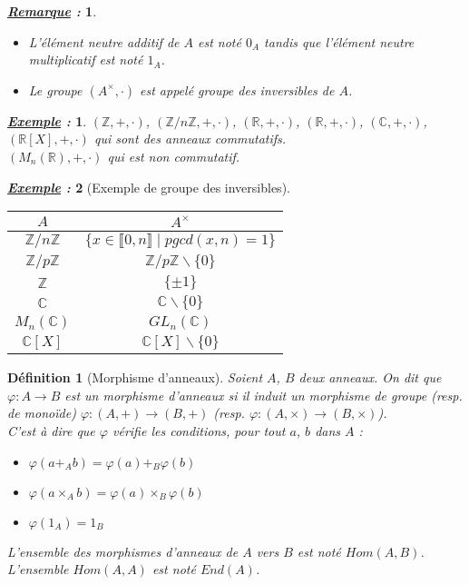 \documentclass{article}           %
\newcommand\Z{\mathbb{Z}}
\newcommand\R{\mathbb{R}}
\newcommand\C{\mathbb{C}}
\newcommand\inter[1]{\llbracket {#1} \rrbracket} 	%
\theoremstyle{break}
\theoremstyle{add}
\theoremstyle{break} %
\newtheorem{definition}{Définition}[section]
\theoremstyle{add}
\newtheorem*{exemple}{\textit{\underline{Exemple} :}}
\newtheorem*{remarque}{\textit{\underline{Remarque} : }}
\newcommand\NL{
\mbox{}
\vspace*{-\parsep}
\vspace*{-\baselineskip}}
\begin{document}
\begin{remarque}\NL
\begin{itemize}
\item L’élément neutre additif de $A$ est noté $0_A$ tandis que l'élément neutre multiplicatif est noté $1_A$.
\item Le groupe $(A^{\times}, \cdot)$ est appelé \textit{groupe des inversibles} de $A$.
\end{itemize}
\end{remarque}

\begin{exemple}
$(\Z, +, \cdot)$, $(\Z /n \Z, +, \cdot)$, $(\R, +, \cdot)$, $(\R, +, \cdot)$, $(\C, +, \cdot)$, $(\R[X], +, \cdot)$ qui sont des anneaux commutatifs.\\
$(M_n(\R), +, \cdot)$ qui est non commutatif.
\end{exemple}

\begin{exemple}[Exemple de groupe des inversibles]\NL
\begin{tabular}{|c|c|}
\hline
$A$ & $A^\times$ \\
\hline
\hline
$\Z /n \Z$ & $\{x \in \inter{0,n} \;|\; pgcd(x,n)=1 \} $\\
\hline
$\Z /p \Z$ & $\Z /p \Z \backslash \{0\}$ \\
\hline
$\Z$ & $\{ \pm 1 \}$ \\
\hline
$\C$ & $\C \backslash \{0\}$ \\
\hline
$M_n(\C)$ & $GL_n(\C)$ \\
\hline
$\C[X]$ & $\C[X] \backslash \{0\}$ \\
\hline
\end{tabular}
\end{exemple}

\begin{definition}[Morphisme d'anneaux]
Soient $A$, $B$ deux anneaux. On dit que $\varphi : A \rightarrow B$ est un morphisme d'anneaux si il induit un morphisme de groupe (resp. de monoïde) $\varphi : (A, +) \rightarrow (B,+)$ (resp. $\varphi : (A, \times) \rightarrow (B,\times)$). \\
C'est à dire que $\varphi$ vérifie les conditions, pour tout $a$, $b$ dans $A$ :
\begin{itemize}
\item $\varphi(a +_A b) = \varphi(a) +_B \varphi(b)$
\item $\varphi(a \times_A b) = \varphi(a) \times_B \varphi(b)$
\item $\varphi(1_A) = 1_B$
\end{itemize}
L'ensemble des morphismes d'anneaux de $A$ vers $B$ est noté $Hom(A,B)$. L'ensemble $Hom(A,A)$ est noté $End(A)$.
\end{definition}
\end{document}
